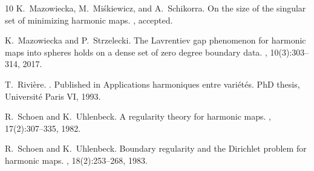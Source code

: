 \documentclass[12pt]{amsart}
\numberwithin{theorem}{section} \numberwithin{equation}{section}
\begin{document}
\begin{thebibliography}{10}
	K.~Mazowiecka, M.~Mi\'{s}kiewicz, and A.~Schikorra.
	\newblock On the size of the singular set of minimizing harmonic maps.
	, accepted.
	
	K.~Mazowiecka and P.~Strzelecki.
	\newblock The {L}avrentiev gap phenomenon for harmonic maps into spheres holds
	on a dense set of zero degree boundary data.
	, 10(3):303--314, 2017.
	
	T.~Rivi{\`{e}}re.
	.
	\newblock Published in Applications harmoniques entre vari\'{e}t\'{e}s.
	\newblock PhD thesis, Universit\'{e} Paris VI, 1993.
	
	R.~Schoen and K.~Uhlenbeck.
	\newblock A regularity theory for harmonic maps.
	, 17(2):307--335, 1982.
	
	R.~Schoen and K.~Uhlenbeck.
	\newblock Boundary regularity and the {D}irichlet problem for harmonic maps.
	, 18(2):253--268, 1983.
	
\end{thebibliography}
\end{document}

